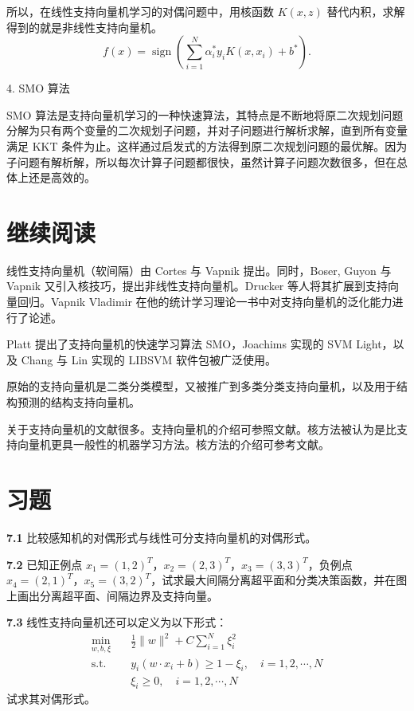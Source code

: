 \documentclass[UTF8, 12pt, fontset=fandol, oneside]{ctexart}
\begin{document}
所以，在线性支持向量机学习的对偶问题中，用核函数 $K(x,z)$ 替代内积，求解得到的就是非线性支持向量机。
\[
f(x)=\operatorname{sign}\left(\sum_{i=1}^N\alpha_i^*y_iK(x,x_i)+b^*\right).
\]

4. SMO 算法

SMO 算法是支持向量机学习的一种快速算法，其特点是不断地将原二次规划问题分解为只有两个变量的二次规划子问题，并对子问题进行解析求解，直到所有变量满足 KKT 条件为止。这样通过启发式的方法得到原二次规划问题的最优解。因为子问题有解析解，所以每次计算子问题都很快，虽然计算子问题次数很多，但在总体上还是高效的。

\section*{继续阅读}

线性支持向量机（软间隔）由 Cortes 与 Vapnik 提出。同时，Boser, Guyon 与 Vapnik 又引入核技巧，提出非线性支持向量机。Drucker 等人将其扩展到支持向量回归。Vapnik Vladimir 在他的统计学习理论一书中对支持向量机的泛化能力进行了论述。

Platt 提出了支持向量机的快速学习算法 SMO，Joachims 实现的 SVM Light，以及 Chang 与 Lin 实现的 LIBSVM 软件包被广泛使用。

原始的支持向量机是二类分类模型，又被推广到多类分类支持向量机，以及用于结构预测的结构支持向量机。

关于支持向量机的文献很多。支持向量机的介绍可参照文献。核方法被认为是比支持向量机更具一般性的机器学习方法。核方法的介绍可参考文献。

\section*{习题}

\noindent\textbf{7.1}\quad
比较感知机的对偶形式与线性可分支持向量机的对偶形式。

\noindent\textbf{7.2}\quad
已知正例点 $x_1=(1,2)^T$，$x_2=(2,3)^T$，$x_3=(3,3)^T$，负例点 $x_4=(2,1)^T$，$x_5=(3,2)^T$，试求最大间隔分离超平面和分类决策函数，并在图上画出分离超平面、间隔边界及支持向量。

\noindent\textbf{7.3}\quad
线性支持向量机还可以定义为以下形式：
\[
\begin{aligned}
\min_{w,b,\xi}\quad & \frac{1}{2}\|w\|^2+C\sum_{i=1}^N\xi_i^2\\
\mathrm{s.t.}\quad & y_i(w\cdot x_i+b)\geq 1-\xi_i,\quad i=1,2,\cdots,N\\
& \xi_i\geq 0,\quad i=1,2,\cdots,N
\end{aligned}
\]
试求其对偶形式。
\end{document}

